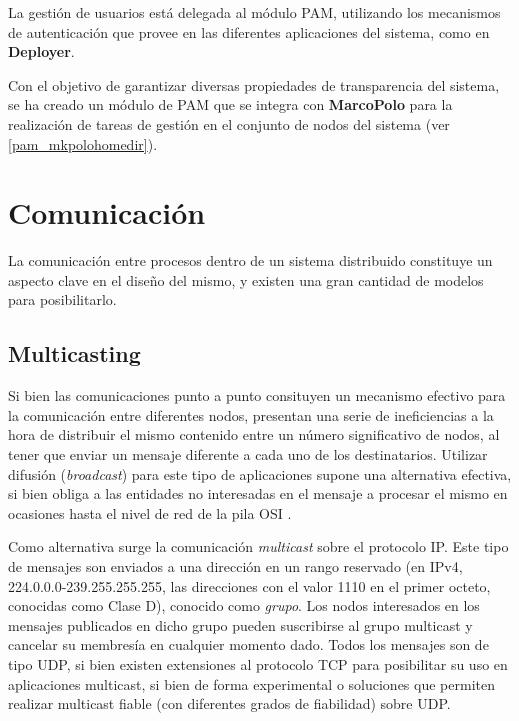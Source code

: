 La gestión de usuarios está delegada al módulo PAM, utilizando los mecanismos de autenticación que provee en las diferentes aplicaciones del sistema, como en \textbf{Deployer}.

Con el objetivo de garantizar diversas propiedades de transparencia del sistema, se ha creado un módulo de PAM que se integra con \textbf{MarcoPolo} para la realización de tareas de gestión en el conjunto de nodos del sistema (ver \ref{pam_mkpolohomedir}).

\section{Comunicación}

La comunicación entre procesos dentro de un sistema distribuido constituye un aspecto clave en el diseño del mismo, y existen una gran cantidad de modelos para posibilitarlo.

\subsection{Multicasting}

Si bien las comunicaciones punto a punto consituyen un mecanismo efectivo para la comunicación entre diferentes nodos, presentan una serie de ineficiencias a la hora de distribuir el mismo contenido entre un número significativo de nodos, al tener que enviar un mensaje diferente a cada uno de los destinatarios. Utilizar difusión (\textit{broadcast}) para este tipo de aplicaciones supone una alternativa efectiva, si bien obliga a las entidades no interesadas en el mensaje a procesar el mismo en ocasiones hasta el nivel de red de la pila OSI \citationneeded.

Como alternativa surge la comunicación \textit{multicast} sobre el protocolo IP. Este tipo de mensajes son enviados a una dirección en un rango reservado (en IPv4, 224.0.0.0-239.255.255.255, las direcciones con el valor 1110 en el primer octeto, conocidas como Clase D\cite{rfc791}), conocido como \textit{grupo}. Los nodos interesados en los mensajes publicados en dicho grupo pueden suscribirse al grupo multicast y cancelar su membresía en cualquier momento dado. Todos los mensajes son de tipo UDP, si bien existen extensiones al protocolo TCP para posibilitar su uso en aplicaciones multicast, si bien de forma experimental\cite{1019386, mysore2001ftp, Barcellos01efficienttcp-like, Visoottiviseth01m/tcp:the, talpadereliablemulticast} o soluciones que permiten realizar multicast fiable (con diferentes grados de fiabilidad) sobre UDP\cite{rfc2887}.

